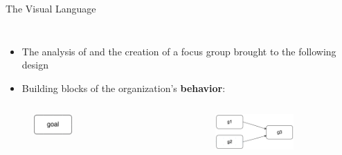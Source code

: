 \begin{frame}[allowframebreaks]{The Visual Language}
\begin{columns}
\begin{column}{0.25\textwidth}
\begin{figure}
        \end{figure}
    \end{column}
\end{columns}

\framebreak

\begin{itemize}
    \vspace{-0.5cm}
    \item The analysis of \moise{} and the creation of a focus group brought to the following design
    \vspace{0.5cm}
    \item Building blocks of the organization's \textbf{behavior}:
\end{itemize}

\begin{columns}
    \begin{column}{0.5\textwidth}
        \begin{figure}
            \centering
            \includegraphics[width=0.35\textwidth]{images/visual-language/goal.png}
        \end{figure}
    \end{column}
    \begin{column}{0.5\textwidth}
        \begin{figure}
            \centering
            \includegraphics[width=0.7\textwidth]{images/visual-language/dependency-and.png}
        \end{figure}
    \end{column}
\end{columns}


\end{frame}
